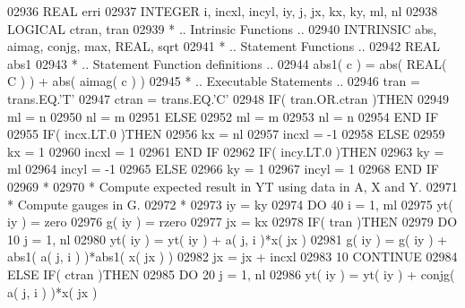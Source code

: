 \begin{DoxyCode}
02936       \textcolor{keywordtype}{REAL}               erri
02937       \textcolor{keywordtype}{INTEGER}            i, incxl, incyl, iy, j, jx, kx, ky, ml, nl
02938       \textcolor{keywordtype}{LOGICAL}            ctran, tran
02939 \textcolor{comment}{*     .. Intrinsic Functions ..}
02940       \textcolor{keywordtype}{INTRINSIC}          abs, aimag, conjg, max, \textcolor{keywordtype}{REAL}, sqrt
02941 \textcolor{comment}{*     .. Statement Functions ..}
02942       \textcolor{keywordtype}{REAL}               abs1
02943 \textcolor{comment}{*     .. Statement Function definitions ..}
02944       abs1( c ) = abs( \textcolor{keywordtype}{REAL( C )} ) + abs( aimag( c ) )
02945 \textcolor{comment}{*     .. Executable Statements ..}
02946       tran = trans.EQ.\textcolor{stringliteral}{'T'}
02947       ctran = trans.EQ.\textcolor{stringliteral}{'C'}
02948       \textcolor{keywordflow}{IF}( tran.OR.ctran )\textcolor{keywordflow}{THEN}
02949          ml = n
02950          nl = m
02951       \textcolor{keywordflow}{ELSE}
02952          ml = m
02953          nl = n
02954 \textcolor{keywordflow}{      END IF}
02955       \textcolor{keywordflow}{IF}( incx.LT.0 )\textcolor{keywordflow}{THEN}
02956          kx = nl
02957          incxl = -1
02958       \textcolor{keywordflow}{ELSE}
02959          kx = 1
02960          incxl = 1
02961 \textcolor{keywordflow}{      END IF}
02962       \textcolor{keywordflow}{IF}( incy.LT.0 )\textcolor{keywordflow}{THEN}
02963          ky = ml
02964          incyl = -1
02965       \textcolor{keywordflow}{ELSE}
02966          ky = 1
02967          incyl = 1
02968 \textcolor{keywordflow}{      END IF}
02969 \textcolor{comment}{*}
02970 \textcolor{comment}{*     Compute expected result in YT using data in A, X and Y.}
02971 \textcolor{comment}{*     Compute gauges in G.}
02972 \textcolor{comment}{*}
02973       iy = ky
02974       \textcolor{keywordflow}{DO} 40 i = 1, ml
02975          yt( iy ) = zero
02976          g( iy ) = rzero
02977          jx = kx
02978          \textcolor{keywordflow}{IF}( tran )\textcolor{keywordflow}{THEN}
02979             \textcolor{keywordflow}{DO} 10 j = 1, nl
02980                yt( iy ) = yt( iy ) + a( j, i )*x( jx )
02981                g( iy ) = g( iy ) + abs1( a( j, i ) )*abs1( x( jx ) )
02982                jx = jx + incxl
02983    10       \textcolor{keywordflow}{CONTINUE}
02984          \textcolor{keywordflow}{ELSE} \textcolor{keywordflow}{IF}( ctran )\textcolor{keywordflow}{THEN}
02985             \textcolor{keywordflow}{DO} 20 j = 1, nl
02986                yt( iy ) = yt( iy ) + conjg( a( j, i ) )*x( jx )

\end{DoxyCode}
